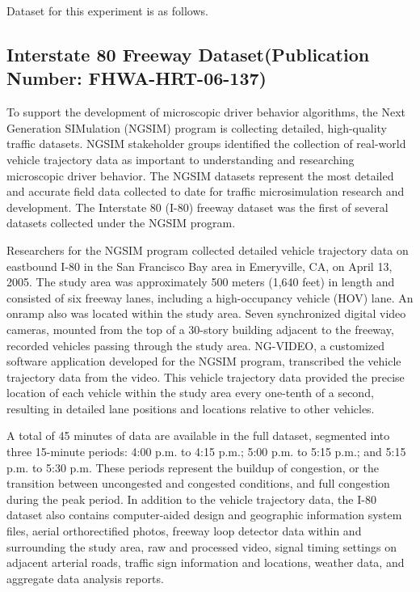 Dataset for this experiment is as follows.

\subsection{Interstate 80 Freeway Dataset(Publication Number: FHWA-HRT-06-137)}


To support the development of microscopic driver behavior algorithms, the Next Generation SIMulation (NGSIM) program is collecting detailed, high-quality traffic datasets. NGSIM stakeholder groups identified the collection of real-world vehicle trajectory data as important to understanding and researching microscopic driver behavior. The NGSIM datasets represent the most detailed and accurate field data collected to date for traffic microsimulation research and development. The Interstate 80 (I-80) freeway dataset was the first of several datasets collected under the NGSIM program.

Researchers for the NGSIM program collected detailed vehicle trajectory data on eastbound I-80 in the San Francisco Bay area in Emeryville, CA, on April 13, 2005. The study area was approximately 500 meters (1,640 feet) in length and consisted of six freeway lanes, including a high-occupancy vehicle (HOV) lane. An onramp also was located within the study area. Seven synchronized digital video cameras, mounted from the top of a 30-story building adjacent to the freeway, recorded vehicles passing through the study area. NG-VIDEO, a customized software application developed for the NGSIM program, transcribed the vehicle trajectory data from the video. This vehicle trajectory data provided the precise location of each vehicle within the study area every one-tenth of a second, resulting in detailed lane positions and locations relative to other vehicles. 

A total of 45 minutes of data are available in the full dataset, segmented into three 15-minute periods: 4:00 p.m. to 4:15 p.m.; 5:00 p.m. to 5:15 p.m.; and 5:15 p.m. to 5:30 p.m. These periods represent the buildup of congestion, or the transition between uncongested and congested conditions, and full congestion during the peak period. In addition to the vehicle trajectory data, the I-80 dataset also contains computer-aided design and geographic information system files, aerial orthorectified photos, freeway loop detector data within and surrounding the study area, raw and processed video, signal timing settings on adjacent arterial roads, traffic sign information and locations, weather data, and aggregate data analysis reports.


